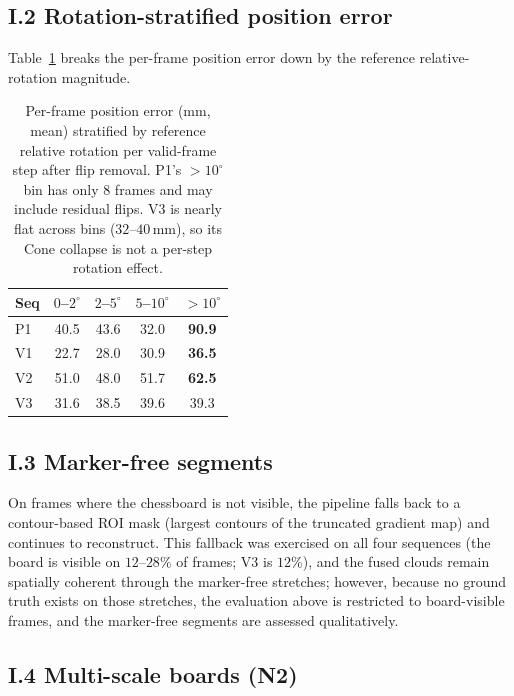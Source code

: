 \documentclass[review]{elsarticle}
\begin{document}
\subsection*{I.2 Rotation-stratified position error}

Table~\ref{tab:supp_rot_strat} breaks the per-frame position error down by the reference relative-rotation magnitude.

\begin{table}[h]
\centering
\caption{Per-frame position error (mm, mean) stratified by reference relative rotation per valid-frame step after flip removal. P1's ${>}10^{\circ}$ bin has only 8 frames and may include residual flips. V3 is nearly flat across bins ($32$--$40$\,mm), so its Cone collapse is not a per-step rotation effect.}
\label{tab:supp_rot_strat}
\setlength{\tabcolsep}{4pt}
\renewcommand{\arraystretch}{1.05}
\begin{tabular}{l cccc}
\toprule
Seq & $0$--$2^{\circ}$ & $2$--$5^{\circ}$ & $5$--$10^{\circ}$ & $>10^{\circ}$ \\
\midrule
P1 & 40.5 & 43.6 & 32.0 & \textbf{90.9} \\
V1 & 22.7 & 28.0 & 30.9 & \textbf{36.5} \\
V2 & 51.0 & 48.0 & 51.7 & \textbf{62.5} \\
V3 & 31.6 & 38.5 & 39.6 & 39.3 \\
\bottomrule
\end{tabular}
\end{table}

\subsection*{I.3 Marker-free segments}

On frames where the chessboard is not visible, the pipeline falls back to a contour-based ROI mask (largest contours of the truncated gradient map) and continues to reconstruct. This fallback was exercised on all four sequences (the board is visible on $12$--$28\%$ of frames; V3 is $12\%$), and the fused clouds remain spatially coherent through the marker-free stretches; however, because no ground truth exists on those stretches, the evaluation above is restricted to board-visible frames, and the marker-free segments are assessed qualitatively.

\subsection*{I.4 Multi-scale boards (N2)}
\end{document}

